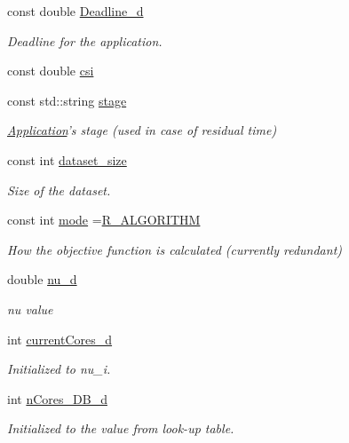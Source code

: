 \begin{DoxyCompactItemize}
const double \hyperlink{classApplication_ae90c165056428718e7341999781a3963}{Deadline\-\_\-d}
\begin{DoxyCompactList}\small\item\em Deadline for the application. \end{DoxyCompactList}\item 
const double \hyperlink{classApplication_a7c4d5b6d8d7b2c480008dbd958872ed2}{csi}
\item 
const std\-::string \hyperlink{classApplication_a27731ed4d16f6e9583b52c4f09a69258}{stage}
\begin{DoxyCompactList}\small\item\em \hyperlink{classApplication}{Application}'s stage (used in case of residual time) \end{DoxyCompactList}\item 
const int \hyperlink{classApplication_a83bcec93383a2816d9bbaa51b7dfa0c6}{dataset\-\_\-size}
\begin{DoxyCompactList}\small\item\em Size of the dataset. \end{DoxyCompactList}\item 
const int \hyperlink{classApplication_a351cf2c8500b5b5520aeeac8f53c7f74}{mode} =\hyperlink{application_8hh_aaeed326368abd712225f9ca34c338fbf}{R\-\_\-\-A\-L\-G\-O\-R\-I\-T\-H\-M}
\begin{DoxyCompactList}\small\item\em How the objective function is calculated (currently redundant) \end{DoxyCompactList}\item 
double \hyperlink{classApplication_a42c22b9a3130cf1f2722ce222f2e5bae}{nu\-\_\-d}
\begin{DoxyCompactList}\small\item\em nu value \end{DoxyCompactList}\item 
int \hyperlink{classApplication_adee341a84a5389dfd4d16e7f8e697190}{current\-Cores\-\_\-d}
\begin{DoxyCompactList}\small\item\em Initialized to nu\-\_\-i. \end{DoxyCompactList}\item 
int \hyperlink{classApplication_a95104d330c9c7ed2c1017b4938a39a9a}{n\-Cores\-\_\-\-D\-B\-\_\-d}
\begin{DoxyCompactList}\small\item\em Initialized to the value from look-\/up table. \end{DoxyCompactList}\item 

\end{DoxyCompactItemize}
